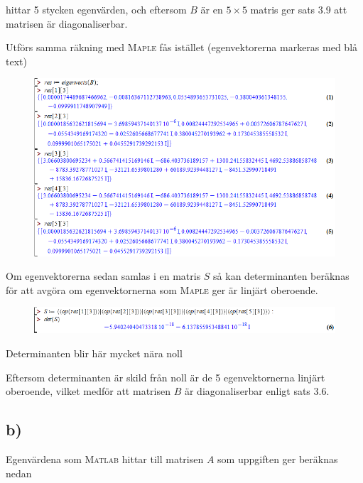 \documentclass[a4paper]{article}
\newcommand{\mat}[1]{\bm{\mathit{#1}}}
\begin{document}
\noindent {} hittar 5 stycken egenvärden, och eftersom $\mat{B}$ är en
$5\times 5$ matris ger sats 3.9 att matrisen är diagonaliserbar.

Utförs samma räkning med \textsc{Maple} fås istället (egenvektorerna markeras
med blå text)

\FloatBarrier
\begin{figure}[h!]
  \centering
  \includegraphics[width=1.2\linewidth]{figurer/maple_1_2_a1.png}
\end{figure}
\FloatBarrier

\noindent Om egenvektorerna sedan samlas i en matris $\mat{S}$ så kan
determinanten beräknas för att avgöra om egenvektornerna som \textsc{Maple} ger
är linjärt oberoende.

\FloatBarrier
\begin{figure}[h!]
  \centering
  \includegraphics[width=1.2\linewidth]{figurer/maple_1_2_a2.png}
\end{figure}
\FloatBarrier

\noindent Determinanten blir här mycket nära noll

\noindent Eftersom  determinanten är skild från noll är de 5 egenvektornerna linjärt
oberoende, vilket medför att matrisen $\mat{B}$ är diagonaliserbar enligt sats 3.6.

\subsection*{b)}

Egenvärdena som \textsc{Matlab} hittar till matrisen $\mat{A}$ som uppgiften ger
beräknas nedan
\end{document}
